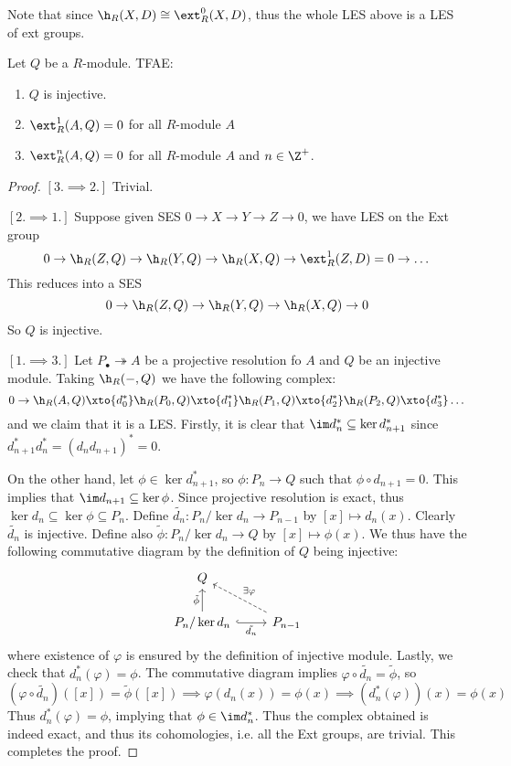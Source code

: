 \begin{re}
    Note that since $\h_R(X,D)\cong \ext_R^0(X,D)$, thus the whole LES above is a LES of ext groups.
\end{re}

\medskip

\begin{thm}
    Let $Q$ be a $R$-module. TFAE:
    \begin{enumerate}
        \item $Q$ is injective.
        \item $\ext^1_R(A,Q)=0$ for all $R$-module $A$
        \item $\ext^n_R(A,Q)=0$ for all $R$-module $A$ and $n\in\Z^+$.
    \end{enumerate}
\end{thm}
\begin{proof}
	\hfill

    $[3. \implies 2.]$ Trivial.

    $[2. \implies 1.]$ Suppose given SES $0 \to X\to Y\to Z\to 0$, we have LES on the Ext group
    \[0 \to \h_R(Z,Q) \to \h_R(Y,Q) \to \h_R(X,Q) \to \ext_R^1(Z,D)=0\to \dots\]
    This reduces into a SES
    \[0 \to \h_R(Z,Q) \to \h_R(Y,Q) \to \h_R(X,Q) \to 0\]
    So $Q$ is injective.

	$[1. \implies 3.]$ Let $P_\bullet \twoheadrightarrow A$ be a projective resolution fo $A$ and $Q$ be an injective module. Taking $\h_R(-, Q)$ we have the following complex: 
	\[0 \to \h_R(A,Q) \xto{d_0^*} \h_R(P_0,Q) \xto{d_1^*} \h_R(P_1,Q) \xto{d_2^*} \h_R(P_2,Q) \xto{d_3^*} \dots\]
	and we claim that it is a LES. Firstly, it is clear that $\im d_n^* \subseteq \ker d_{n+1}^*$ since $d_{n+1}^*d_n^* = (d_nd_{n+1})^* = 0$.

	On the other hand, let $\phi \in \ker d_{n+1}^*$, so $\phi:P_n \to Q$ such that $\phi \circ d_{n+1} = 0$. This implies that $\im d_{n+1}\subseteq \ker \phi$. Since projective resolution is exact, thus $\ker d_n \subseteq \ker \phi \subseteq P_n$. Define $\tilde{d_n}:P_n/\ker d_n \to P_{n-1}$ by $[x]\mapsto d_n(x)$. Clearly $\tilde{d_n}$ is injective. Define also $\tilde{\phi}:P_n/\ker d_n \to Q$ by $[x] \mapsto \phi(x)$. We thus have the following commutative diagram by the definition of $Q$ being injective:
	\[\begin{tikzcd}[sep=small]
	Q \\
	\\
	{P_n /\ker d_n} && {P_{n-1}}
	\arrow["{\tilde{\phi}}", from=3-1, to=1-1]
	\arrow["{\tilde{d_n}}"', hook, from=3-1, to=3-3]
	\arrow["{\exists \varphi}"', dashed, from=3-3, to=1-1]
	\end{tikzcd}\] 
	where existence of $\varphi$ is ensured by the definition of injective module. Lastly, we check that $d_n^*(\varphi) = \phi$. The commutative diagram implies $\varphi \circ \tilde{d_n} = \tilde{\phi}$, so 
	\[(\varphi \circ \tilde{d_n})([x]) = \tilde{\phi}([x]) \implies \varphi(d_n(x)) = \phi(x) \implies (d_n^*(\varphi))(x) = \phi(x)\]
	Thus $d_n^*(\varphi) = \phi$, implying that $\phi\in \im d_n^*$. Thus the complex obtained is indeed exact, and thus its cohomologies, i.e. all the Ext groups, are trivial. This completes the proof.
\end{proof}


